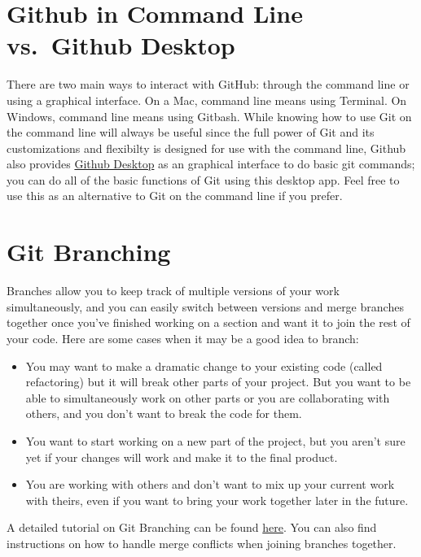 \documentclass[
]{book}
\providecommand{\tightlist}{%
  \setlength{\itemsep}{0pt}\setlength{\parskip}{0pt}}
\begin{document}
\section{Github in Command Line vs.~Github Desktop}\label{github-in-command-line-vs.-github-desktop}

There are two main ways to interact with GitHub: through the command line or using a graphical interface. On a Mac, command line means using Terminal. On Windows, command line means using Gitbash. While knowing how to use Git on the command line will always be useful since the full power of Git and its customizations and flexibilty is designed for use with the command line, Github also provides \href{https://desktop.github.com/}{Github Desktop} as an graphical interface to do basic git commands; you can do all of the basic functions of Git using this desktop app. Feel free to use this as an alternative to Git on the command line if you prefer.

\section{Git Branching}\label{git-branching}

Branches allow you to keep track of multiple versions of your work simultaneously, and you can easily switch between versions and merge branches together once you've finished working on a section and want it to join the rest of your code. Here are some cases when it may be a good idea to branch:

\begin{itemize}
\tightlist
\item
  You may want to make a dramatic change to your existing code (called refactoring) but it will break other parts of your project. But you want to be able to simultaneously work on other parts or you are collaborating with others, and you don't want to break the code for them.
\item
  You want to start working on a new part of the project, but you aren't sure yet if your changes will work and make it to the final product.
\item
  You are working with others and don't want to mix up your current work with theirs, even if you want to bring your work together later in the future.
\end{itemize}

A detailed tutorial on Git Branching can be found \href{https://sp19.datastructur.es/materials/guides/using-git\#e-git-branching-advanced-git-optional}{here}. You can also find instructions on how to handle merge conflicts when joining branches together.
\end{document}
